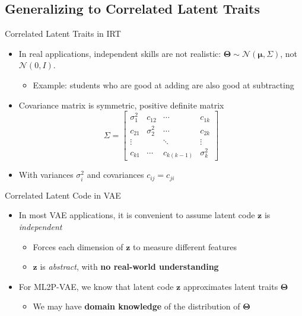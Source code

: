 \documentclass{beamer}
\newcommand{\vect}[1]{\boldsymbol{#1}}
\theoremstyle{definition}
\begin{document}
\subsection{Generalizing to Correlated Latent Traits}

\begin{frame}{Correlated Latent Traits in IRT}
\begin{itemize}
  \item In real applications, independent skills are not realistic: $\vect \Theta \sim \mathcal{N}(\vect \mu, \Sigma)$, not $\mathcal{N}(0,I)$.
  \begin{itemize}
    \item Example: students who are good at adding are also good at subtracting
  \end{itemize}
  \item<2-> Covariance matrix is symmetric, positive definite matrix
  \[\Sigma = \begin{bmatrix}
  \sigma_1^2 & c_{12} & \cdots & c_{1k} \\
  c_{21} & \sigma_2^2 & \cdots & c_{2k} \\
  \vdots & & \ddots & \vdots \\
  c_{k1} & \cdots & c_{k(k-1)} & \sigma_k^2
  \end{bmatrix}\]
  \item<2-> With variances $\sigma_i^2$ and covariances $c_{ij} = c_{ji}$
\end{itemize}
\end{frame}

\begin{frame}{Correlated Latent Code in VAE}
\begin{itemize}
  \item In most VAE applications, it is convenient to assume latent code $\vect z$ is \textit{independent}
    \begin{itemize}
      \item Forces each dimension of $\vect z$ to measure different features
      \item $\vect z$ is \textit{abstract}, with \textbf{no real-world understanding}
    \end{itemize}
  \item For ML2P-VAE, we know that latent code $\vect z$ approximates latent traits $\vect \Theta$
    \begin{itemize}
      \item We may have \textbf{domain knowledge} of the distribution of $\vect \Theta$
    \end{itemize}
\end{itemize}
\end{frame}
\end{document}
